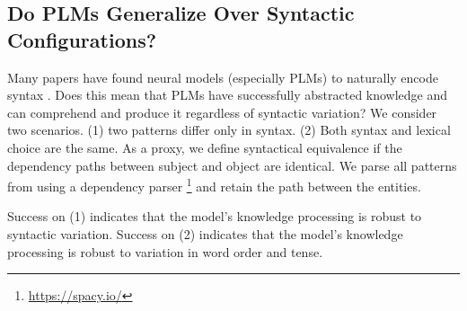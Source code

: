 % 

% 





% 




\subsection{Do PLMs Generalize Over Syntactic Configurations?} 



Many papers have found neural models (especially PLMs) to naturally
encode syntax
\cite{linzen2016assessing,belinkov2017neural,marvin-linzen-2018-targeted,yoav-syntax,hewitt2019structural}.
Does this mean that PLMs have successfully abstracted
knowledge and can comprehend and produce it regardless of
syntactic variation?
We consider two scenarios. (1) two patterns differ only in
syntax. (2) Both  syntax and  lexical choice are the same.
As a proxy, we define syntactical equivalence if the dependency
paths between subject and object are identical.
We parse all patterns from \resource{} using a dependency parser \cite{spacy}\footnote{\url{https://spacy.io/}} and retain the path between the entities.

Success on (1) indicates
that the model's knowledge processing is robust to syntactic
variation.
Success on (2) indicates
that the model's knowledge processing is robust to
variation in word order and tense.



